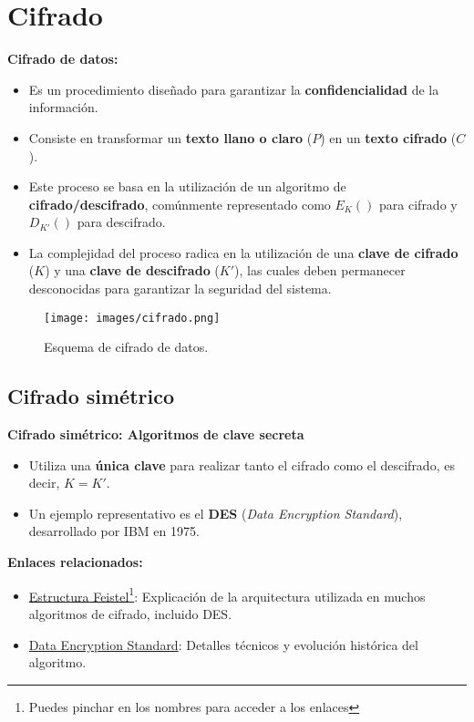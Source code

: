 \documentclass[a4paper,12pt]{article}
\begin{document}
\section{Cifrado}

\textbf{Cifrado de datos:}

\begin{itemize}
    \item Es un procedimiento diseñado para garantizar la \textbf{confidencialidad} de la información.
    \item Consiste en transformar un \textbf{texto llano o claro} (\(P\)) en un \textbf{texto cifrado} (\(C\)).
    \item Este proceso se basa en la utilización de un algoritmo de \textbf{cifrado/descifrado}, comúnmente representado como \(E_K()\) para cifrado y \(D_{K'}()\) para descifrado.
    \item La complejidad del proceso radica en la utilización de una \textbf{clave de cifrado} (\(K\)) y una \textbf{clave de descifrado} (\(K'\)), las cuales deben permanecer desconocidas para garantizar la seguridad del sistema.
\end{itemize}

\begin{figure}[H]
    \centering
    \texttt{[image: images/cifrado.png]}
    \caption{Esquema de cifrado de datos.}
\end{figure}
\newpage
\subsection{Cifrado simétrico}
\textbf{Cifrado simétrico: Algoritmos de clave secreta}

\begin{itemize}
    \item Utiliza una \textbf{única clave} para realizar tanto el cifrado como el descifrado, es decir, \(K = K'\).
    \item Un ejemplo representativo es el \textbf{DES} (\textit{Data Encryption Standard}), desarrollado por IBM en 1975.
\end{itemize}

\textbf{Enlaces relacionados:}
\begin{itemize}
    \item \href{http://en.wikipedia.org/wiki/Feistel_network}{Estructura Feistel}\footnote{Puedes pinchar en los nombres para acceder a los enlaces}: Explicación de la arquitectura utilizada en muchos algoritmos de cifrado, incluido DES.
    \item \href{http://en.wikipedia.org/wiki/Data_Encryption_Standard}{Data Encryption Standard}: Detalles técnicos y evolución histórica del algoritmo.
\end{itemize}
\end{document}
